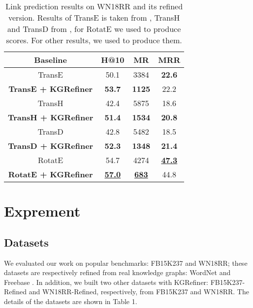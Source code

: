 \documentclass{article} \usepackage{iclr2022_conference,times}
\begin{document}
\begin{table*}[h]
\begin{center}
\begin{tabular}{|c|ccc|}
\hline
Baseline                    & H@10                & MR                 & MRR                 \\ \hline
TransE                      & 50.1                & 3384               & \textbf{22.6}       \\
\textbf{TransE + KGRefiner} & \textbf{53.7}       & \textbf{1125}      & 22.2                \\ \hline
TransH                      & 42.4                & 5875               & 18.6                \\ \textbf{TransH + KGRefiner} & \textbf{51.4}       & \textbf{1534}      & \textbf{20.8}       \\ \hline
TransD                      & 42.8                & 5482               & 18.5                \\
\textbf{TransD + KGRefiner} & \textbf{52.3}       & \textbf{1348}      & \textbf{21.4}       \\ \hline
RotatE                      & 54.7                & 4274               & {\ul \textbf{47.3}} \\
\textbf{RotatE + KGRefiner} & {\ul \textbf{57.0}} & {\ul \textbf{683}} & 44.8                \\ \hline
\end{tabular}


  \caption{Link prediction results on WN18RR and its refined version. Results of TransE is taken from \protect\citep{convkb}, TransH and TransD from \protect\citep{zhang2018knowledge}, for RotatE we used \protect\citep{han2018openke} to produce scores. For other results, we used \protect\citep{han2018openke} to produce them.}

\end{center}
\end{table*}

\section{Exprement}
\subsection{Datasets}
We evaluated our work on popular benchmarks: FB15K237 and WN18RR; these datasets are respectively refined from real knowledge graphs: WordNet \citep{wordnet} and Freebase \citep{freebase}. In addition, we built two other datasets with KGRefiner: FB15K237-Refined and WN18RR-Refined, respectively, from FB15K237  and WN18RR. The details of the datasets are shown in Table 1.
\end{document}
